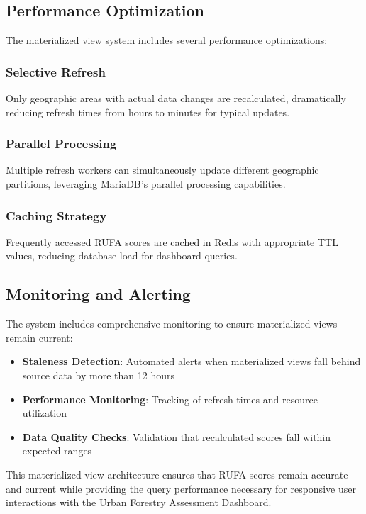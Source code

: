 \subsection{Performance Optimization}

The materialized view system includes several performance optimizations:

\subsubsection{Selective Refresh}
Only geographic areas with actual data changes are recalculated, dramatically reducing refresh times from hours to minutes for typical updates.

\subsubsection{Parallel Processing}
Multiple refresh workers can simultaneously update different geographic partitions, leveraging MariaDB's parallel processing capabilities.

\subsubsection{Caching Strategy}
Frequently accessed RUFA scores are cached in Redis with appropriate TTL values, reducing database load for dashboard queries.

\subsection{Monitoring and Alerting}

The system includes comprehensive monitoring to ensure materialized views remain current:

\begin{itemize}
    \item \textbf{Staleness Detection}: Automated alerts when materialized views fall behind source data by more than 12 hours
    \item \textbf{Performance Monitoring}: Tracking of refresh times and resource utilization
    \item \textbf{Data Quality Checks}: Validation that recalculated scores fall within expected ranges
\end{itemize}

This materialized view architecture ensures that RUFA scores remain accurate and current while providing the query performance necessary for responsive user interactions with the Urban Forestry Assessment Dashboard.

